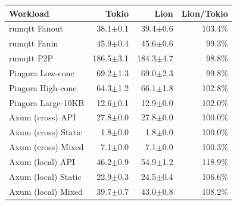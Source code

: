 \begin{tabular}{@{}l r r r@{}}
\toprule
Workload & Tokio & Lion & Lion/Tokio \\
\midrule
rumqtt Fanout & 38.1$\pm$0.1 & 39.4$\pm$0.6 & 103.4\% \\
rumqtt Fanin & 45.9$\pm$0.4 & 45.6$\pm$0.6 & 99.3\% \\
rumqtt P2P & 186.5$\pm$3.1 & 184.3$\pm$4.7 & 98.8\% \\
Pingora Low-conc & 69.2$\pm$1.3 & 69.0$\pm$2.3 & 99.8\% \\
Pingora High-conc & 64.3$\pm$1.2 & 66.1$\pm$1.8 & 102.8\% \\
Pingora Large-10KB & 12.6$\pm$0.1 & 12.9$\pm$0.0 & 102.0\% \\
Axum (cross) API & 27.8$\pm$0.0 & 27.8$\pm$0.0 & 100.0\% \\
Axum (cross) Static & 1.8$\pm$0.0 & 1.8$\pm$0.0 & 100.0\% \\
Axum (cross) Mixed & 7.1$\pm$0.0 & 7.1$\pm$0.0 & 100.3\% \\
Axum (local) API & 46.2$\pm$0.9 & 54.9$\pm$1.2 & 118.9\% \\
Axum (local) Static & 22.9$\pm$0.3 & 24.5$\pm$0.4 & 106.6\% \\
Axum (local) Mixed & 39.7$\pm$0.7 & 43.0$\pm$0.8 & 108.2\% \\
\bottomrule
\end{tabular}
